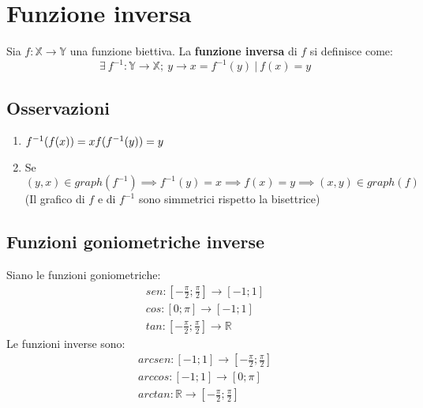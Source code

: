 \section{Funzione inversa}
Sia $f: \mathbb{X} \rightarrow \mathbb{Y}$ una funzione biettiva. La \textbf{funzione inversa} di $f$ si definisce come:
\begin{equation}
\exists\ f^{-1}: \mathbb{Y} \rightarrow \mathbb{X};\ y \rightarrow x = f^{-1}(y)\ |\ f(x) = y
\end{equation}
\subsection{Osservazioni}
\begin{enumerate}
\item $f^{-1}(f(x))=x\\
f(f^{-1}(y))=y$
\item Se $(y,x) \in graph(f^{-1}) \implies f^{-1}(y) = x \implies f(x)=y \implies (x,y) \in graph(f)$\\
(Il grafico di $f$ e di $f^{-1}$ sono simmetrici rispetto la bisettrice)
\end{enumerate}
\subsection{Funzioni goniometriche inverse}
Siano le funzioni goniometriche:
\begin{equation}
\begin{gathered}
sen: [-\frac{\pi}{2};\frac{\pi}{2}] \rightarrow [-1;1]\\
cos: [0;\pi] \rightarrow [-1;1]\\
tan: [-\frac{\pi}{2};\frac{\pi}{2}] \rightarrow \mathbb{R}
\end{gathered}
\end{equation}
Le funzioni inverse sono:
\begin{equation}
\begin{gathered}
arcsen: [-1;1] \rightarrow [-\frac{\pi}{2};\frac{\pi}{2}]\\
arccos: [-1;1] \rightarrow [0;\pi]\\
arctan: \mathbb{R} \rightarrow [-\frac{\pi}{2};\frac{\pi}{2}]
\end{gathered}
\end{equation}